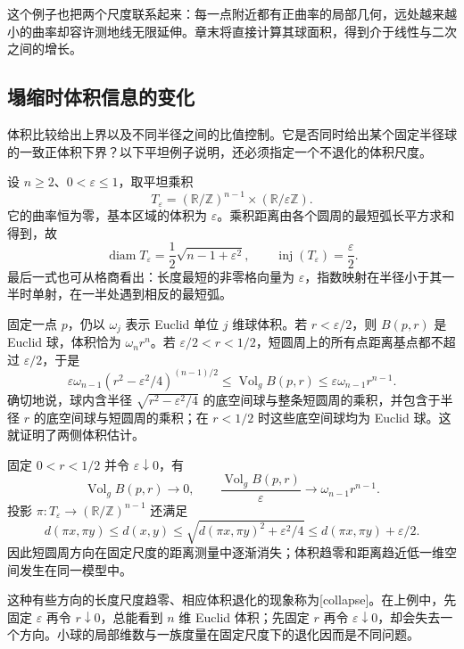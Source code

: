 这个例子也把两个尺度联系起来：每一点附近都有正曲率的局部几何，远处越来越小的曲率却容许测地线无限延伸。章末将直接计算其球面积，得到介于线性与二次之间的增长。

\subsection{塌缩时体积信息的变化}
\label{g3:subsec:0804:02}

体积比较给出上界以及不同半径之间的比值控制。它是否同时给出某个固定半径球的一致正体积下界？以下平坦例子说明，还必须指定一个不退化的体积尺度。

\begin{example}\label{g3:exm:collapsing-flat-tori}
	设 \(n\ge2\)、\(0<\varepsilon\le1\)，取平坦乘积
	\[
		T_\varepsilon=(\mathbb R/\mathbb Z)^{n-1}
		\times(\mathbb R/\varepsilon\mathbb Z).
	\]
	它的曲率恒为零，基本区域的体积为 \(\varepsilon\)。乘积距离由各个圆周的最短弧长平方求和得到，故
	\[
		\operatorname{diam}T_\varepsilon
		=\frac12\sqrt{n-1+\varepsilon^2},\qquad
		\operatorname{inj}(T_\varepsilon)=\frac\varepsilon2.
	\]
	最后一式也可从格商看出：长度最短的非零格向量为 \(\varepsilon\)，指数映射在半径小于其一半时单射，在一半处遇到相反的最短弧。

	固定一点 \(p\)，仍以 \(\omega_j\) 表示 Euclid 单位 \(j\) 维球体积。若 \(r<\varepsilon/2\)，则 \(B(p,r)\) 是 Euclid 球，体积恰为 \(\omega_n r^n\)。若 \(\varepsilon/2<r<1/2\)，短圆周上的所有点距离基点都不超过 \(\varepsilon/2\)，于是
	\begin{equation}\label{g3:eq:collapsed-ball-estimate}
		\varepsilon\omega_{n-1}(r^2-\varepsilon^2/4)^{(n-1)/2}
		\le\operatorname{Vol}_g B(p,r)
		\le\varepsilon\omega_{n-1}r^{n-1}.
	\end{equation}
	确切地说，球内含半径 \(\sqrt{r^2-\varepsilon^2/4}\) 的底空间球与整条短圆周的乘积，并包含于半径 \(r\) 的底空间球与短圆周的乘积；在 \(r<1/2\) 时这些底空间球均为 Euclid 球。这就证明了两侧体积估计。

	固定 \(0<r<1/2\) 并令 \(\varepsilon\downarrow0\)，有
	\[
		\operatorname{Vol}_g B(p,r)\longrightarrow0,
		\qquad
		\frac{\operatorname{Vol}_g B(p,r)}\varepsilon
		\longrightarrow\omega_{n-1}r^{n-1}.
	\]
	投影 \(\pi:T_\varepsilon\to(\mathbb R/\mathbb Z)^{n-1}\) 还满足
	\[
		d(\pi x,\pi y)\le d(x,y)
		\le\sqrt{d(\pi x,\pi y)^2+\varepsilon^2/4}
		\le d(\pi x,\pi y)+\varepsilon/2.
	\]
	因此短圆周方向在固定尺度的距离测量中逐渐消失；体积趋零和距离趋近低一维空间发生在同一模型中。
\end{example}

这种有些方向的长度尺度趋零、相应体积退化的现象称为[collapse]。在上例中，先固定 \(\varepsilon\) 再令 \(r\downarrow0\)，总能看到 \(n\) 维 Euclid 体积；先固定 \(r\) 再令 \(\varepsilon\downarrow0\)，却会失去一个方向。小球的局部维数与一族度量在固定尺度下的退化因而是不同问题。

